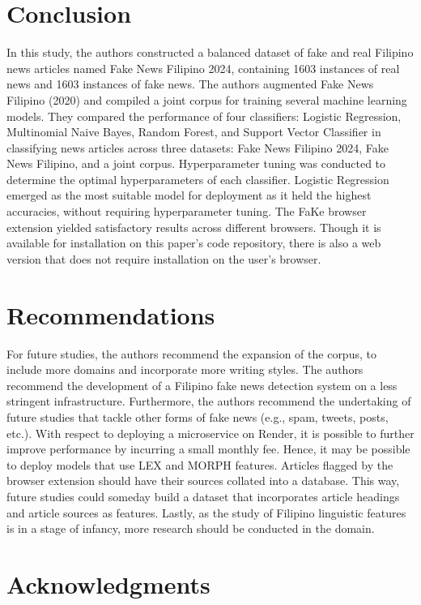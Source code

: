 \documentclass[conference]{IEEEtran}
\begin{document}
\section{Conclusion}

In this study, the authors constructed a balanced dataset of fake and real Filipino news articles named Fake News Filipino 2024, containing 1603 instances of real news and 1603 instances of fake news. The authors augmented Fake News Filipino (2020) and compiled a joint corpus for training several machine learning models. They compared the performance of four classifiers: Logistic Regression, Multinomial Naive Bayes, Random Forest, and Support Vector Classifier in classifying news articles across three datasets: Fake News Filipino 2024, Fake News Filipino, and a joint corpus. Hyperparameter tuning was conducted to determine the optimal hyperparameters of each classifier. Logistic Regression emerged as the most suitable model for deployment as it held the highest accuracies, without requiring hyperparameter tuning. The FaKe browser extension yielded satisfactory results across different browsers. Though it is available for installation on this paper's code repository, there is also a web version that does not require installation on the user's browser.

\section{Recommendations}

For future studies, the authors recommend the expansion of the corpus, to include more domains and incorporate more writing styles. The authors recommend the development of a Filipino fake news detection system on a less stringent infrastructure. Furthermore, the authors recommend the undertaking of future studies that tackle other forms of fake news (e.g., spam, tweets, posts, etc.). With respect to deploying a microservice on Render, it is possible to further improve performance by incurring a small monthly fee. Hence, it may be possible to deploy models that use LEX and MORPH features. Articles flagged by the browser extension should have their sources collated into a database. This way, future studies could someday build a dataset that incorporates article headings and article sources as features. Lastly, as the study of Filipino linguistic features is in a stage of infancy, more research should be conducted in the domain.  

\section*{Acknowledgments}
\end{document}
